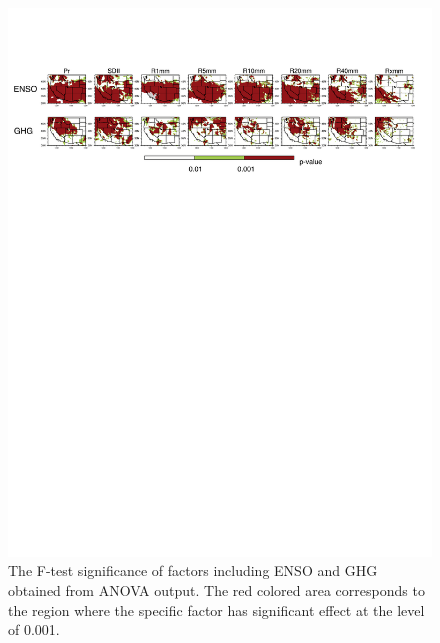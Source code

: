 \documentclass{ametsoc}
\begin{document}
\begin{figure}
\begin{center}
\includegraphics[width=6in]{lm_fit_pvalue.pdf}
\caption{The F-test significance of factors including ENSO and GHG obtained from ANOVA output. The red colored area corresponds to the region where the specific factor has significant effect at the level of 0.001.}
\end{center}
\label{fig:S6}
\end{figure}
\end{document}
